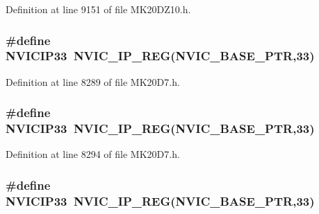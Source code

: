 Definition at line 9151 of file M\+K20\+D\+Z10.\+h.

\subsubsection[{\texorpdfstring{N\+V\+I\+C\+I\+P33}{NVICIP33}}]{\setlength{\rightskip}{0pt plus 5cm}\#define N\+V\+I\+C\+I\+P33~{\bf N\+V\+I\+C\+\_\+\+I\+P\+\_\+\+R\+EG}({\bf N\+V\+I\+C\+\_\+\+B\+A\+S\+E\+\_\+\+P\+TR},33)}\hypertarget{group___n_v_i_c___register___accessor___macros_gadc41b59b169585e795775fbf5e2ad99b}{}\label{group___n_v_i_c___register___accessor___macros_gadc41b59b169585e795775fbf5e2ad99b}


Definition at line 8289 of file M\+K20\+D7.\+h.

\subsubsection[{\texorpdfstring{N\+V\+I\+C\+I\+P33}{NVICIP33}}]{\setlength{\rightskip}{0pt plus 5cm}\#define N\+V\+I\+C\+I\+P33~{\bf N\+V\+I\+C\+\_\+\+I\+P\+\_\+\+R\+EG}({\bf N\+V\+I\+C\+\_\+\+B\+A\+S\+E\+\_\+\+P\+TR},33)}\hypertarget{group___n_v_i_c___register___accessor___macros_gadc41b59b169585e795775fbf5e2ad99b}{}\label{group___n_v_i_c___register___accessor___macros_gadc41b59b169585e795775fbf5e2ad99b}


Definition at line 8294 of file M\+K20\+D7.\+h.

\subsubsection[{\texorpdfstring{N\+V\+I\+C\+I\+P33}{NVICIP33}}]{\setlength{\rightskip}{0pt plus 5cm}\#define N\+V\+I\+C\+I\+P33~{\bf N\+V\+I\+C\+\_\+\+I\+P\+\_\+\+R\+EG}({\bf N\+V\+I\+C\+\_\+\+B\+A\+S\+E\+\_\+\+P\+TR},33)}\hypertarget{group___n_v_i_c___register___accessor___macros_gadc41b59b169585e795775fbf5e2ad99b}{}\label{group___n_v_i_c___register___accessor___macros_gadc41b59b169585e795775fbf5e2ad99b}


